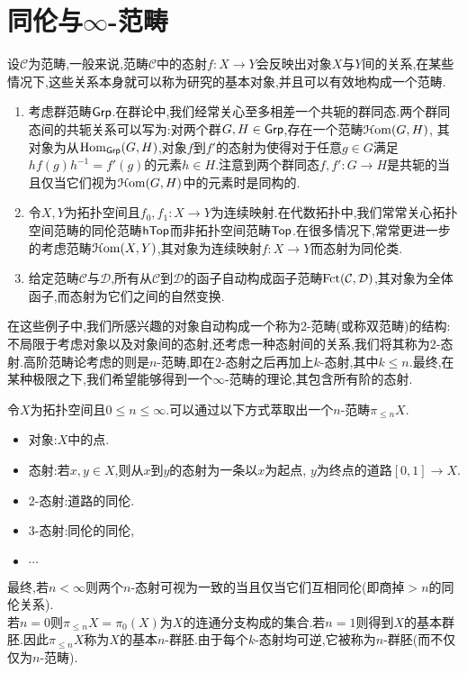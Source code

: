 \section{同伦与$\infty$-范畴}
设$\mathcal{C}$为范畴,一般来说,范畴$\mathcal{C}$中的态射$f : X \to Y$会反映出对象$X$与$Y$间的关系,在某些情况下,这些关系本身就可以称为研究的基本对象,并且可以有效地构成一个范畴.
\begin{example}\label{例:同伦}
    \begin{enumerate}
        \item 考虑群范畴$\mathsf{Grp}$.在群论中,我们经常关心至多相差一个共轭的群同态.两个群同态间的共轭关系可以写为:对两个群$G,H\in \mathsf{Grp}$,存在一个范畴$\EuScript{H}\mathrm{om}(G,H)$, 其对象为从$\operatorname{Hom}_{\mathsf{Grp}}(G,H)$,对象$f$到$f'$的态射为使得对于任意$g\in G$满足$hf(g)h^{-1} = f'(g)$的元素$h\in H$.注意到两个群同态$f,f' : G \to H$是共轭的当且仅当它们视为$\EuScript{H}\mathrm{om}(G,H)$中的元素时是同构的.
        \item 令$X,Y$为拓扑空间且$f_0,f_1 : X\to Y$为连续映射.在代数拓扑中,我们常常关心拓扑空间范畴的同伦范畴$\mathsf{hTop}$而非拓扑空间范畴$\mathsf{Top}$.在很多情况下,常常更进一步的考虑范畴$\EuScript{H}\mathrm{om}(X,Y)$,其对象为连续映射$f : X \to Y$而态射为同伦类.
        \item 给定范畴$\mathcal{C}$与$\mathcal{D}$,所有从$\mathcal{C}$到$\mathcal{D}$的函子自动构成函子范畴$\operatorname{Fct}(\mathcal{C},\mathcal{D})$,其对象为全体函子,而态射为它们之间的自然变换.
    \end{enumerate}
\end{example}
在这些例子中,我们所感兴趣的对象自动构成一个称为2-范畴(或称双范畴)的结构:不局限于考虑对象以及对象间的态射,还考虑一种态射间的关系,我们将其称为$2$-态射.高阶范畴论考虑的则是$n$-范畴,即在$2$-态射之后再加上$k$-态射,其中$k \leq n$.最终,在某种极限之下,我们希望能够得到一个$\infty$-范畴的理论,其包含所有阶的态射.
\begin{example}[群胚]\label{Exp:群胚}
    令$X$为拓扑空间且$0 \leq n \leq \infty$.可以通过以下方式萃取出一个$n$-范畴$\pi_{\leq n} X$. 
    \begin{itemize}
        \item 对象:$X$中的点.
        \item 态射:若$x,y\in X$,则从$x$到$y$的态射为一条以$x$为起点, $y$为终点的道路$[0,1]\to X$.
        \item 2-态射:道路的同伦.
        \item 3-态射:同伦的同伦,
        \item $\cdots$
    \end{itemize}
    最终,若$n < \infty$则两个$n$-态射可视为一致的当且仅当它们互相同伦(即商掉$>n$的同伦关系).\\
    若$n = 0$则$\pi_{\leq n}X = \pi_0(X)$为$X$的连通分支构成的集合.若$n = 1$则得到$X$的基本群胚.因此$\pi_{\leq n}X$称为$X$的基本$n$-群胚.由于每个$k$-态射均可逆,它被称为$n$-群胚(而不仅仅为$n$-范畴).
\end{example}
